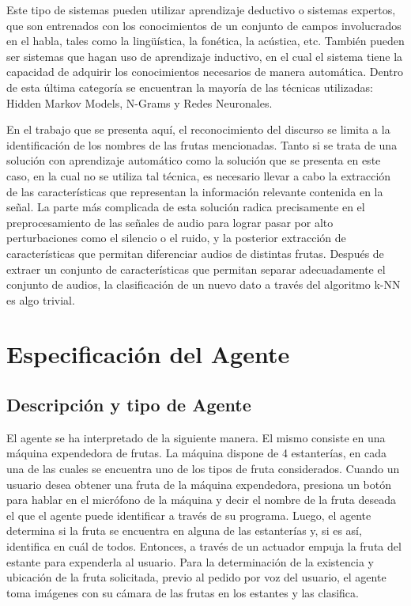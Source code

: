 \documentclass[a4paper, 12pt]{article}
\begin{document}
Este tipo de sistemas pueden utilizar aprendizaje deductivo o sistemas expertos, que son entrenados con los conocimientos de un conjunto de campos involucrados en el habla, tales como la lingüística, la fonética, la acústica, etc. También pueden ser sistemas que hagan uso de aprendizaje inductivo, en el cual el sistema tiene la capacidad de adquirir los conocimientos necesarios de manera automática. Dentro de esta última categoría se encuentran la mayoría de las técnicas utilizadas: Hidden Markov Models, N-Grams y Redes Neuronales.

En el trabajo que se presenta aquí, el reconocimiento del discurso se limita a la identificación de los nombres de las frutas mencionadas. Tanto si se trata de una solución con aprendizaje automático como la solución que se presenta en este caso, en la cual no se utiliza tal técnica, es necesario llevar a cabo la extracción de las características que representan la información relevante contenida en la señal. La parte más complicada de esta solución radica precisamente en el preprocesamiento de las señales de audio para lograr pasar por alto perturbaciones como el silencio o el ruido, y la posterior extracción de características que permitan diferenciar audios de distintas frutas. Después de extraer un conjunto de características que permitan separar adecuadamente el conjunto de audios, la clasificación de un nuevo dato a través del algoritmo k-NN es algo trivial.
\section{Especificación del Agente}
\subsection{Descripción y tipo de Agente}

El agente se ha interpretado de la siguiente manera. El mismo consiste en una máquina expendedora de frutas. La máquina dispone de 4 estanterías, en cada una de las cuales se encuentra uno de los tipos de fruta considerados. Cuando un usuario desea obtener una fruta de la máquina expendedora, presiona un botón para hablar en el micrófono de la máquina y decir el nombre de la fruta deseada el que el agente puede identificar a través de su programa. Luego, el agente determina si la fruta se encuentra en alguna de las estanterías y, si es así, identifica en cuál de todos. Entonces, a través de un actuador empuja la fruta del estante para expenderla al usuario. Para la determinación de la existencia y ubicación de la fruta solicitada, previo al pedido por voz del usuario, el agente toma imágenes con su cámara de las frutas en los estantes y las clasifica.
\end{document}
